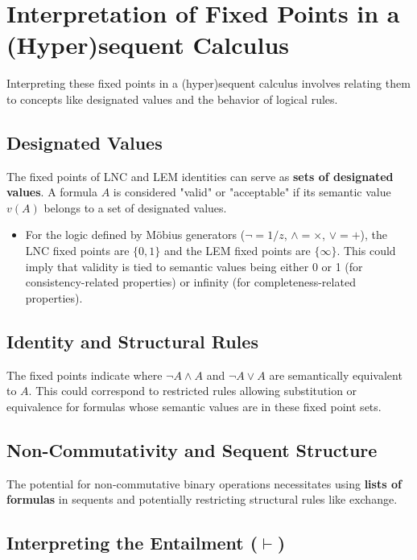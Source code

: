 \documentclass{article}
\begin{document}
	\section{Interpretation of Fixed Points in a (Hyper)sequent Calculus}
	
	Interpreting these fixed points in a (hyper)sequent calculus involves relating them to concepts like designated values and the behavior of logical rules.
	
	\subsection{Designated Values}
	
	The fixed points of LNC and LEM identities can serve as \textbf{sets of designated values}. A formula $A$ is considered "valid" or "acceptable" if its semantic value $v(A)$ belongs to a set of designated values.
	
	\begin{itemize}
		\item For the logic defined by M\"{o}bius generators ($\neg=1/z$, $\wedge=\times$, $\vee=+$), the LNC fixed points are $\{0, 1\}$ and the LEM fixed points are $\{\infty\}$. This could imply that validity is tied to semantic values being either 0 or 1 (for consistency-related properties) or infinity (for completeness-related properties).
	\end{itemize}
	
	\subsection{Identity and Structural Rules}
	
	The fixed points indicate where $\neg A \wedge A$ and $\neg A \vee A$ are semantically equivalent to $A$. This could correspond to restricted rules allowing substitution or equivalence for formulas whose semantic values are in these fixed point sets.
	
	\subsection{Non-Commutativity and Sequent Structure}
	
	The potential for non-commutative binary operations necessitates using \textbf{lists of formulas} in sequents and potentially restricting structural rules like exchange.
	
	\subsection{Interpreting the Entailment ($\vdash$)}
	
\end{document}
